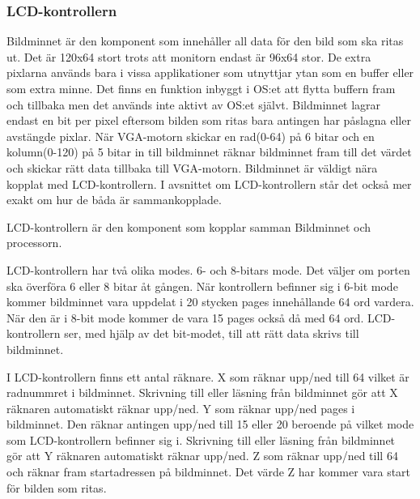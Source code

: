 \documentclass[main.tex]{subfiles}
\begin{document}
\subsubsection{LCD-kontrollern}
Bildminnet är den komponent som innehåller all data för den bild som ska ritas
ut. Det är 120x64 stort trots att monitorn endast är 96x64 stor. De extra
pixlarna används bara i vissa applikationer som utnyttjar ytan som en buffer
eller som extra minne. Det finns en funktion inbyggt i OS:et att flytta buffern
fram och tillbaka men det används inte aktivt av OS:et självt. Bildminnet
lagrar endast en bit per pixel eftersom bilden som ritas bara antingen har
påslagna eller avstängde pixlar.  När VGA-motorn skickar en rad(0-64) på 6
bitar och en kolumn(0-120) på 5 bitar in till bildminnet räknar bildminnet fram
till det värdet och skickar rätt data tillbaka till VGA-motorn. Bildminnet är
väldigt nära kopplat med LCD-kontrollern. I avsnittet om LCD-kontrollern står
det också mer exakt om hur de båda är sammankopplade.

LCD-kontrollern är den komponent som kopplar samman Bildminnet och processorn.

LCD-kontrollern har två olika modes. 6- och 8-bitars mode. Det väljer om porten
ska överföra 6 eller 8 bitar åt gången. När kontrollern befinner sig i 6-bit
mode kommer bildminnet vara uppdelat i 20 stycken pages innehållande 64 ord
vardera. När den är i 8-bit mode kommer de vara 15 pages också då med 64 ord.
LCD-kontrollern ser, med hjälp av det bit-modet, till att rätt data skrivs till
bildminnet.

I LCD-kontrollern finns ett antal räknare.  X som räknar upp/ned till 64 vilket
är radnummret i bildminnet. Skrivning till eller läsning från bildminnet gör
att X räknaren automatiskt räknar upp/ned.  Y som räknar upp/ned pages i
bildminnet. Den räknar antingen upp/ned till 15 eller 20 beroende på vilket
mode som LCD-kontrollern befinner sig i. Skrivning till eller läsning från
bildminnet gör att Y räknaren automatiskt räknar upp/ned.  Z som räknar upp/ned
till 64 och räknar fram startadressen på bildminnet. Det värde Z har kommer
vara start för bilden som ritas.
\end{document}
